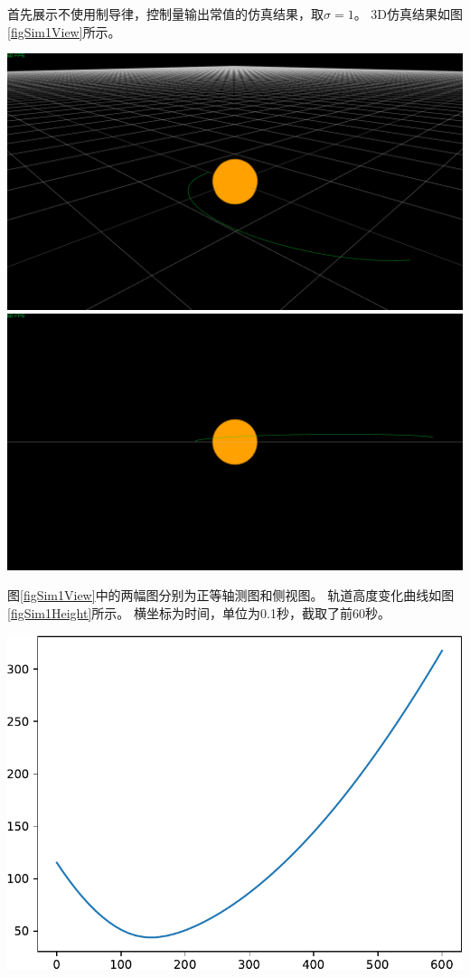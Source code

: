 首先展示不使用制导律，控制量输出常值的仿真结果，取$\sigma=1$。
3D仿真结果如图\ref{figSim1View}所示。
\begin{center}
	\includegraphics[scale=0.2]{sim1Verticalview.png}  \\
	\includegraphics[scale=0.2]{sim1Sideview.png}  \\
	\label{figSim1View}
\end{center}
图\ref{figSim1View}中的两幅图分别为正等轴测图和侧视图。
轨道高度变化曲线如图\ref{figSim1Height}所示。
横坐标为时间，单位为0.1秒，截取了前60秒。
\begin{center}
	\includegraphics[scale=0.6]{sim1Height.pdf} \\
	\label{figSim1Height}
\end{center}

